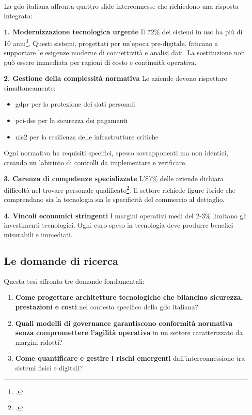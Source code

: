 La \gls{gdo} italiana affronta quattro sfide interconnesse che richiedono una risposta integrata:

\textbf{1. Modernizzazione tecnologica urgente}
Il 72\% dei sistemi in uso ha più di 10 anni\footcite{federdistribuzione2023}. Questi sistemi, progettati per un'epoca pre-digitale, faticano a supportare le esigenze moderne di connettività e analisi dati. La sostituzione non può essere immediata per ragioni di costo e continuità operativa.

\textbf{2. Gestione della complessità normativa}
Le aziende devono rispettare simultaneamente:
\begin{itemize}
\item \gls{gdpr} per la protezione dei dati personali
\item \gls{pci-dss} per la sicurezza dei pagamenti
\item \gls{nis2} per la resilienza delle infrastrutture critiche
\end{itemize}

Ogni normativa ha requisiti specifici, spesso sovrapponenti ma non identici, creando un labirinto di controlli da implementare e verificare.

\textbf{3. Carenza di competenze specializzate}
L'87\% delle aziende dichiara difficoltà nel trovare personale qualificato\footcite{osservatorio2024}. Il settore richiede figure ibride che comprendano sia la tecnologia sia le specificità del commercio al dettaglio.

\textbf{4. Vincoli economici stringenti}
I margini operativi medi del 2-3\% limitano gli investimenti tecnologici. Ogni euro speso in tecnologia deve produrre benefici misurabili e immediati.

\subsection{Le domande di ricerca}
\label{subsec:domande_ricerca}

Questa tesi affronta tre domande fondamentali:

\begin{enumerate}
\item \textbf{Come progettare architetture tecnologiche che bilancino sicurezza, prestazioni e costi} nel contesto specifico della \gls{gdo} italiana?

\item \textbf{Quali modelli di governance garantiscono conformità normativa senza compromettere l'agilità operativa} in un settore caratterizzato da margini ridotti?

\item \textbf{Come quantificare e gestire i rischi emergenti} dall'interconnessione tra sistemi fisici e digitali?
\end{enumerate}

